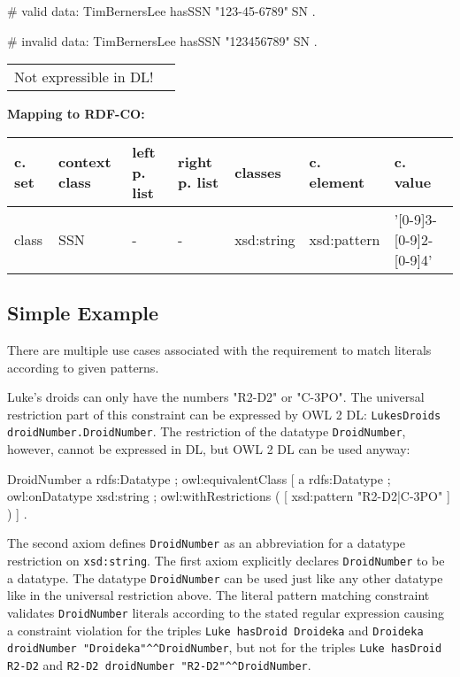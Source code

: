 \documentclass{llncs}
\newcommand{\ms}[1]{\texttt{#1}}
\newenvironment{gcotable}{
  \scriptsize
  \sffamily
  \vspace{0cm}
	\begin{center}
	\textbf{\vspace{0.4cm}Mapping to RDF-CO:} \\
  \begin{tabular}{l|l|l|l|l|l|l}
	\hline
  \textbf{c. set} & \textbf{context class} & \textbf{left p. list} & \textbf{right p. list} & \textbf{classes} & \textbf{c. element} & \textbf{c. value} \\
  \hline

}{
  \hline
  \end{tabular}
	\end{center}
}
\newenvironment{DL}{
\vspace{0cm}
	\begin{center}
  \begin{tabular}{r l}

}{
  \end{tabular}
	\end{center}
}
\begin{document}
\begin{ex}
# valid data:
TimBernersLee
    hasSSN "123-45-6789"^^SSN .
\end{ex}

\begin{ex}
# invalid data:
TimBernersLee
    hasSSN "123456789"^^SSN .
\end{ex}

\begin{DL}
Not expressible in DL!
\end{DL}

\begin{gcotable}
class & SSN & - & - & xsd:string & xsd:pattern & '[0-9]{3}-[0-9]{2}-[0-9]{4}' \\
\end{gcotable}

\subsection{Simple Example}

There are multiple use cases associated with the requirement to match literals according to given patterns.

Luke's droids can only have the numbers "R2-D2" or "C-3PO".
The universal restriction part of this constraint can be expressed by OWL 2 DL:
\ms{LukesDroids   droidNumber.DroidNumber}.
The restriction of the datatype \ms{DroidNumber}, however, cannot be expressed in DL, but OWL 2 DL can be used anyway:

\begin{ex}
DroidNumber 
    a rdfs:Datatype ;
    owl:equivalentClass [
        a rdfs:Datatype ;
        owl:onDatatype xsd:string ;
        owl:withRestrictions ( 
            [ xsd:pattern "R2-D2|C-3PO" ] ) ] .
\end{ex}

The second axiom defines \ms{DroidNumber} as an abbreviation for a datatype restriction on \ms{xsd:string}. 
The first axiom explicitly declares \ms{DroidNumber} to be a datatype. 
The datatype \ms{DroidNumber} can be used just like any other datatype like in the universal restriction above.
The literal pattern matching constraint validates \ms{DroidNumber} literals according to the stated regular expression causing a constraint violation for the triples 
\ms{Luke hasDroid Droideka} and \ms{Droideka droidNumber "Droideka"\textasciicircum{}\textasciicircum{}DroidNumber}, 
but not for the triples \ms{Luke hasDroid R2-D2} and \ms{R2-D2 droidNumber "R2-D2"\textasciicircum{}\textasciicircum{}DroidNumber}.
\end{document}
